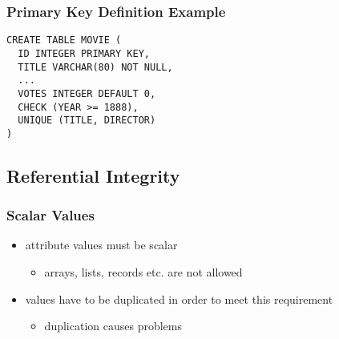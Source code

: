 \documentclass[dvipsnames]{beamer}
\theoremstyle{plain}
\begin{document}
\begin{frame}[fragile]
  \frametitle{Primary Key Definition Example}

  \begin{example}
    \begin{lstlisting}
CREATE TABLE MOVIE (
  ID INTEGER PRIMARY KEY,
  TITLE VARCHAR(80) NOT NULL,
  ...
  VOTES INTEGER DEFAULT 0,
  CHECK (YEAR >= 1888),
  UNIQUE (TITLE, DIRECTOR)
)
    \end{lstlisting}
  \end{example}
\end{frame}

\subsection{Referential Integrity}

\begin{frame}
  \frametitle{Scalar Values}

  \begin{itemize}
    \item attribute values must be scalar
    \begin{itemize}
      \item arrays, lists, records etc. are not allowed
    \end{itemize}

    \pause
    \item values have to be duplicated in order to meet this requirement
    \begin{itemize}
      \item duplication causes problems
    \end{itemize}
  \end{itemize}
\end{frame}
\end{document}
